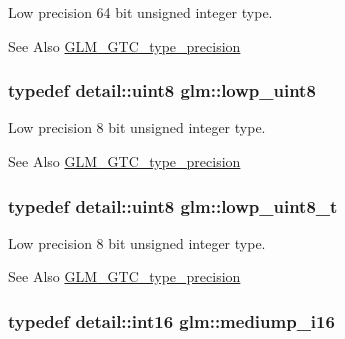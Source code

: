 Low precision 64 bit unsigned integer type. \begin{DoxySeeAlso}{See Also}
\hyperlink{group__gtc__type__precision}{G\-L\-M\-\_\-\-G\-T\-C\-\_\-type\-\_\-precision} 
\end{DoxySeeAlso}
\hypertarget{group__gtc__type__precision_ga4d9dc08b7b248a386dfe9afd00fc6b1e}{
\subsubsection[{lowp\-\_\-uint8}]{\setlength{\rightskip}{0pt plus 5cm}typedef detail\-::uint8 {\bf glm\-::lowp\-\_\-uint8}}}\label{group__gtc__type__precision_ga4d9dc08b7b248a386dfe9afd00fc6b1e}
Low precision 8 bit unsigned integer type. \begin{DoxySeeAlso}{See Also}
\hyperlink{group__gtc__type__precision}{G\-L\-M\-\_\-\-G\-T\-C\-\_\-type\-\_\-precision} 
\end{DoxySeeAlso}
\hypertarget{group__gtc__type__precision_ga0910ef24195d1b8b26e34d73148c0c45}{
\subsubsection[{lowp\-\_\-uint8\-\_\-t}]{\setlength{\rightskip}{0pt plus 5cm}typedef detail\-::uint8 {\bf glm\-::lowp\-\_\-uint8\-\_\-t}}}\label{group__gtc__type__precision_ga0910ef24195d1b8b26e34d73148c0c45}
Low precision 8 bit unsigned integer type. \begin{DoxySeeAlso}{See Also}
\hyperlink{group__gtc__type__precision}{G\-L\-M\-\_\-\-G\-T\-C\-\_\-type\-\_\-precision} 
\end{DoxySeeAlso}
\hypertarget{group__gtc__type__precision_ga8454fc6a82c7bb787d0ac9663e08f63d}{
\subsubsection[{mediump\-\_\-i16}]{\setlength{\rightskip}{0pt plus 5cm}typedef detail\-::int16 {\bf glm\-::mediump\-\_\-i16}}}\label{group__gtc__type__precision_ga8454fc6a82c7bb787d0ac9663e08f63d}
